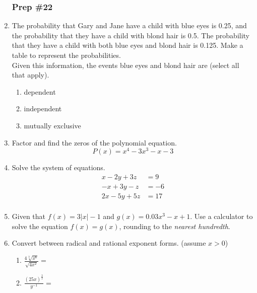 \documentclass[12pt, twoside]{article}
\begin{document}
\begin{enumerate}[itemsep=0.5cm]
\newpage
\subsubsection*{Prep \#22}
\item The probability that Gary and Jane have a child with blue eyes is 0.25, and the probability that they have a child with blond hair is 0.5. The probability that they have a child with both blue eyes and blond hair is 0.125. Make a table to represent the probabilities. \\[0.25cm]
Given this information, the events blue eyes and blond hair are (select all that apply).
\begin{enumerate}
    \item dependent
    \item independent
    \item mutually exclusive
\end{enumerate} \vspace{3cm}


\item Factor and find the zeros of the polynomial equation.
 $$P(x) = x^4-3x^3-x-3$$\vspace{4cm}

\item Solve the system of equations.
\begin{align*}
    x-2y +3z &= 9 \\
    -x+3y -z &= -6 \\
    2x-5y +5z &= 17 \\
\end{align*}

\newpage
\item Given that $f(x)=3|x|-1$ and $g(x)=0.03x^3-x+1$. Use a calculator to solve the equation $f(x)=g(x)$, rounding to the \emph{nearest hundredth}. %
\vspace{3cm}
\item Convert between radical and rational exponent forms. (assume $x > 0$)
    \begin{multicols}{2}
    \begin{enumerate}
        \item $\displaystyle \frac{4\sqrt[3]{x^6}}{\sqrt{4x^2}} = $
        \item $\displaystyle \frac{(25x)^{\frac{3}{2}}}{y^{-1}} =$
    \end{enumerate}
    \end{multicols} \vspace{2cm}


\end{enumerate}
\end{document}
